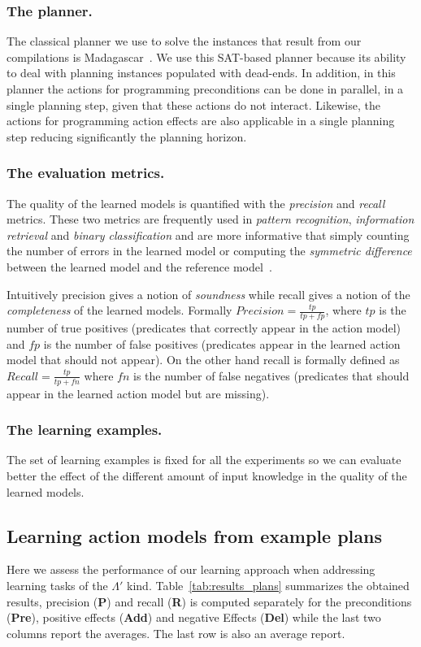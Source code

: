 \documentclass[letterpaper]{article} %
\begin{document}
\subsubsection{The planner.}
The classical planner we use to solve the instances that result from our compilations is {\sc Madagascar}~\cite{rintanen2014madagascar}. We use this SAT-based planner because its ability to deal with planning instances populated with dead-ends. In addition, in this planner the actions for programming preconditions can be done in parallel, in a single planning step, given that these actions do not interact. Likewise, the actions for programming action effects are also applicable in a single planning step reducing significantly the planning horizon.


\subsubsection{The evaluation metrics.}
The quality of the learned models is quantified with the {\em precision} and {\em recall} metrics. These two metrics are frequently used in {\em pattern recognition}, {\em information retrieval} and {\em binary classification} and are more informative that simply counting the number of errors in the learned model or computing the {\em symmetric difference} between the learned model and the reference model~\cite{davis2006relationship}.

Intuitively precision gives a notion of {\em soundness} while recall gives a notion of the {\em completeness} of the learned models. Formally $Precision=\frac{tp}{tp+fp}$, where $tp$ is the number of true positives (predicates that correctly appear in the action model) and $fp$ is the number of false positives (predicates appear in the learned action model that should not appear). On the other hand recall is formally defined as $Recall=\frac{tp}{tp+fn}$ where $fn$ is the number of false negatives (predicates that should appear in the learned action model but are missing).

\subsubsection{The learning examples.}
The set of learning examples is fixed for all the experiments so we can evaluate better the effect of the different amount of input knowledge in the quality of the learned models. %

\subsection{Learning action models from example plans}
Here we assess the performance of our learning approach when addressing learning tasks of the $\Lambda'$ kind. Table~\ref{tab:results_plans} summarizes the obtained results, precision ({\bf P}) and recall ({\bf R}) is computed separately for the preconditions ({\bf Pre}), positive effects ({\bf Add}) and negative Effects ({\bf Del}) while the last two columns report the averages. The last row is also an average report.
\end{document}
